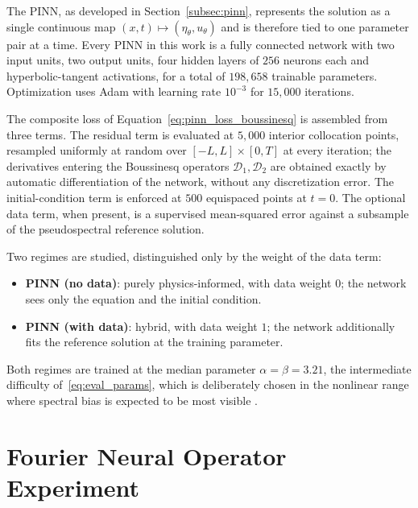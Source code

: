 The PINN, as developed in Section~\ref{subsec:pinn}, represents the solution as a single continuous map $(x,t) \mapsto (\eta_\theta, u_\theta)$ and is therefore tied to one parameter pair at a time. Every PINN in this work is a fully connected network with two input units, two output units, four hidden layers of $256$ neurons each and hyperbolic-tangent activations, for a total of $198{,}658$ trainable parameters. Optimization uses Adam \parencite{kingma2014adam} with learning rate $10^{-3}$ for $15{,}000$ iterations.

The composite loss of Equation~\eqref{eq:pinn_loss_boussinesq} is assembled from three terms. The residual term is evaluated at $5{,}000$ interior collocation points, resampled uniformly at random over $[-L,L] \times [0,T]$ at every iteration; the derivatives entering the Boussinesq operators $\mathcal{D}_1, \mathcal{D}_2$ are obtained exactly by automatic differentiation of the network, without any discretization error. The initial-condition term is enforced at $500$ equispaced points at $t = 0$. The optional data term, when present, is a supervised mean-squared error against a subsample of the pseudospectral reference solution.

Two regimes are studied, distinguished only by the weight of the data term:
\begin{itemize}
    \item \textbf{PINN (no data)}: purely physics-informed, with data weight $0$; the network sees only the equation and the initial condition.
    \item \textbf{PINN (with data)}: hybrid, with data weight $1$; the network additionally fits the reference solution at the training parameter.
\end{itemize}
Both regimes are trained at the median parameter $\alpha = \beta = 3.21$, the intermediate difficulty of~\eqref{eq:eval_params}, which is deliberately chosen in the nonlinear range where spectral bias is expected to be most visible \parencite{wang2024, zheng2023}.

\section{Fourier Neural Operator Experiment}
\label{sec:met_fno}

